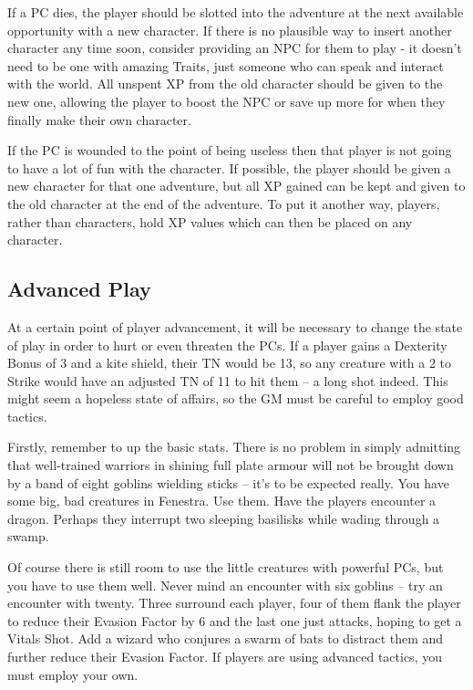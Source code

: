 If a PC dies, the player should be slotted into the adventure at the next available opportunity with a new character. If there is no plausible way to insert another character any time soon, consider providing an NPC for them to play - it doesn't need to be one with amazing Traits, just someone who can speak and interact with the world.  All unspent XP from the old character should be given to the new one, allowing the player to boost the NPC or save up more for when they finally make their own character.

If the PC is wounded to the point of being useless then that player is not going to have a lot of fun with the character. If possible, the player should be given a new character for that one adventure, but all XP gained can be kept and given to the old character at the end of the adventure.
To put it another way, players, rather than characters, hold XP values which can then be placed on any character.

\subsection{Advanced Play}

At a certain point of player advancement, it will be necessary to change the state of play in order to hurt or even threaten the PCs.  If a player gains a Dexterity Bonus of 3 and a kite shield, their TN would be 13, so any creature with a 2 to Strike would have an adjusted TN of 11 to hit them -- a long shot indeed.  This might seem a hopeless state of affairs, so the GM must be careful to employ good tactics.

Firstly, remember to up the basic stats.  There is no problem in simply admitting that well-trained warriors in shining full plate armour will not be brought down by a band of eight goblins wielding sticks -- it's to be expected really.  You have some big, bad creatures in Fenestra.  Use them.  Have the players encounter a dragon.  Perhaps they interrupt two sleeping basilisks while wading through a swamp.

Of course there is still room to use the little creatures with powerful PCs, but you have to use them well.  Never mind an encounter with six goblins -- try an encounter with twenty.  Three surround each player, four of them flank the player to reduce their Evasion Factor by 6 and the last one just attacks, hoping to get a Vitals Shot.  Add a wizard who conjures a swarm of bats to distract them and further reduce their Evasion Factor.  If players are using advanced tactics, you must employ your own.

